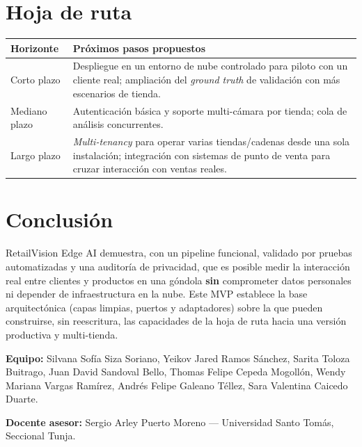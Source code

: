 \documentclass[11pt,a4paper]{report}
\begin{document}
\chapter{Hoja de ruta}

\begin{center}
\renewcommand{\arraystretch}{1.3}
\begin{tabular}{>{\raggedright\arraybackslash}p{3.4cm} >{\raggedright\arraybackslash}p{10cm}}
\toprule
\rowcolor{rvCodeBg}\textbf{Horizonte} & \textbf{Próximos pasos propuestos} \\
\midrule
Corto plazo & Despliegue en un entorno de nube controlado para piloto con un cliente real;
ampliación del \textit{ground truth} de validación con más escenarios de tienda. \\
Mediano plazo & Autenticación básica y soporte multi-cámara por tienda; cola de análisis
concurrentes. \\
Largo plazo & \textit{Multi-tenancy} para operar varias tiendas/cadenas desde una sola
instalación; integración con sistemas de punto de venta para cruzar interacción con ventas
reales. \\
\bottomrule
\end{tabular}
\end{center}

\chapter{Conclusión}

RetailVision Edge AI demuestra, con un pipeline funcional, validado por pruebas automatizadas y
una auditoría de privacidad, que es posible medir la interacción real entre clientes y productos
en una góndola \textbf{sin} comprometer datos personales ni depender de infraestructura en la
nube. Este MVP establece la base arquitectónica (capas limpias, puertos y adaptadores) sobre la
que pueden construirse, sin reescritura, las capacidades de la hoja de ruta hacia una versión
productiva y multi-tienda.

\vspace{1cm}
\textbf{Equipo:} Silvana Sofía Siza Soriano, Yeikov Jared Ramos Sánchez, Sarita Toloza Buitrago,
Juan David Sandoval Bello, Thomas Felipe Cepeda Mogollón, Wendy Mariana Vargas Ramírez, Andrés
Felipe Galeano Téllez, Sara Valentina Caicedo Duarte.

\textbf{Docente asesor:} Sergio Arley Puerto Moreno --- Universidad Santo Tomás, Seccional
Tunja.
\end{document}
